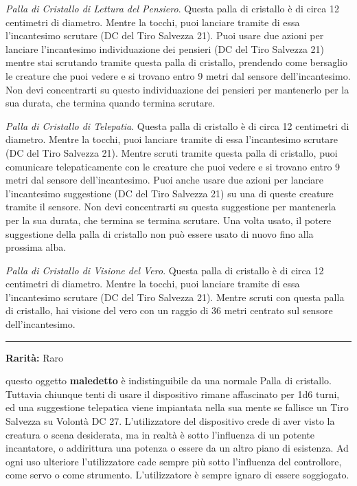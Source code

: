 \begin{multicols}{2}
\emph{Palla di Cristallo di Lettura del Pensiero}. Questa palla di cristallo è di circa 12 centimetri di diametro. Mentre la tocchi, puoi lanciare tramite di essa l'incantesimo scrutare (DC del Tiro Salvezza 21). Puoi usare due azioni per lanciare l'incantesimo individuazione dei pensieri (DC del Tiro Salvezza 21) mentre stai scrutando tramite questa palla di cristallo, prendendo come bersaglio le creature che puoi vedere e si trovano entro 9 metri dal sensore dell'incantesimo. Non devi concentrarti su questo individuazione dei pensieri per mantenerlo per la sua durata, che termina quando termina scrutare.

\emph{Palla di Cristallo di Telepatia}. Questa palla di cristallo è di circa 12 centimetri di diametro. Mentre la tocchi, puoi lanciare tramite di essa l'incantesimo scrutare (DC del Tiro Salvezza 21). Mentre scruti tramite questa palla di cristallo, puoi comunicare telepaticamente con le creature che puoi vedere e si trovano entro 9 metri dal sensore dell'incantesimo. Puoi anche usare due azioni per lanciare l'incantesimo suggestione (DC del Tiro Salvezza 21) su una di queste creature tramite il sensore. Non devi concentrarti su questa suggestione per mantenerla per la sua durata, che termina se termina scrutare. Una volta usato, il potere suggestione della palla di cristallo non può essere usato di nuovo fino alla prossima alba.

\emph{Palla di Cristallo di Visione del Vero}. Questa palla di cristallo è di circa 12 centimetri di diametro. Mentre la tocchi, puoi lanciare tramite di essa l'incantesimo scrutare (DC del Tiro Salvezza 21). Mentre scruti con questa palla di cristallo, hai visione del vero con un raggio di 36 metri centrato sul sensore dell'incantesimo.

\smallskip\noindent\rule{\linewidth}{2pt}  \hypertarget{PalladiCristalloipnotica}{}\medskip{}\noindent\label{PalladiCristalloipnotica}

\textbf{Rarità:} Raro

questo oggetto \textbf{maledetto} è indistinguibile da una normale Palla di cristallo. Tuttavia chiunque tenti di usare il dispositivo rimane affascinato per 1d6 turni, ed una suggestione telepatica viene impiantata nella sua mente se fallisce un Tiro Salvezza su Volontà DC 27. L'utilizzatore del dispositivo crede di aver visto la creatura o scena desiderata, ma in realtà è sotto l'influenza di un potente incantatore, o addirittura una potenza o essere da un altro piano di esistenza. Ad ogni uso ulteriore l'utilizzatore cade sempre più sotto l'influenza del controllore, come servo o come strumento. L'utilizzatore è sempre ignaro di essere soggiogato.


\end{multicols}
